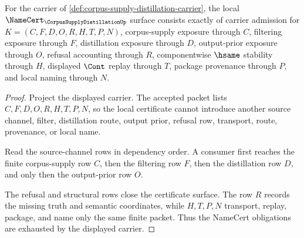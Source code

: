 \begin{theorem}
\label{thm:corpus-supply-distillation-namecert-obligations}
For the carrier of \autoref{def:corpus-supply-distillation-carrier}, the local $\NameCert_{\CorpusSupplyDistillationUp}$ surface consists exactly of carrier admission for $K=(C,F,D,O,R,H,T,P,N)$, corpus-supply exposure through $C$, filtering exposure through $F$, distillation exposure through $D$, output-prior exposure through $O$, refusal accounting through $R$, componentwise $\hsame$ stability through $H$, displayed $\Cont$ replay through $T$, package provenance through $P$, and local naming through $N$.
\end{theorem}
\begin{proof}
Project the displayed carrier. The accepted packet lists $C,F,D,O,R,H,T,P,N$, so the local certificate cannot introduce another source channel, filter, distillation route, output prior, refusal row, transport, route, provenance, or local name.

Read the source-channel rows in dependency order. A consumer first reaches the finite corpus-supply row $C$, then the filtering row $F$, then the distillation row $D$, and only then the output-prior row $O$.

The refusal and structural rows close the certificate surface. The row $R$ records the missing truth and semantic coordinates, while $H,T,P,N$ transport, replay, package, and name only the same finite packet. Thus the NameCert obligations are exhausted by the displayed carrier.
\end{proof}

